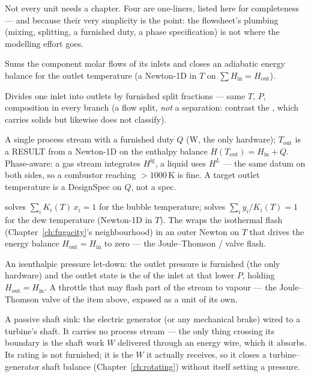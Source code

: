 \documentclass[11pt,a4paper]{article}
\begin{document}
Not every unit needs a chapter.  Four are one-liners, listed here for
completeness --- and because their very simplicity is the point: the
flowsheet's plumbing (mixing, splitting, a furnished duty, a phase
specification) is not where the modelling effort goes.

\begin{description}[leftmargin=*,style=nextline]
  \item[Mixer] Sums the component molar flows of its inlets and closes
        an adiabatic energy balance for the outlet temperature
        (a Newton-1D in $T$ on $\sum H_{\text{in}} = H_{\text{out}}$).
  \item[Splitter] Divides one inlet into outlets by furnished split
        fractions --- same $T$, $P$, composition in every branch (a
        flow split, \emph{not} a separation: contrast the
        , which carries solids but likewise does
        not classify).
  \item[Heater] A single process stream with a furnished duty $Q$
        (W, the only hardware); $T_{\text{out}}$ is a RESULT from a
        Newton-1D on the enthalpy balance $H(T_{\text{out}}) =
        H_{\text{in}} + Q$.  Phase-aware: a gas stream
        integrates $H^{\text{ig}}$, a liquid uses $H^L$ --- the same
        datum on both sides, so a combustor reaching $>1000$\,K is fine.
        A target outlet temperature is a DesignSpec on $Q$, not a spec.
  \item[Saturation \& adiabatic flash]\label{ch:bubble-dew-ref}
         solves $\sum_i K_i(T)\,x_i = 1$ for the bubble
        temperature;  solves $\sum_i y_i/K_i(T) = 1$ for the
        dew temperature (Newton-1D in $T$).  The 
        wraps the isothermal flash (Chapter~\ref{ch:fugacity}'s
        neighbourhood) in an outer Newton on $T$ that drives the
        energy balance $H_{\text{out}}=H_{\text{in}}$ to zero --- the
        Joule--Thomson / valve flash.
  \item[Valve] An isenthalpic pressure let-down: the outlet pressure is
        furnished (the only hardware) and the outlet state is the
         of the inlet at that lower $P$, holding
        $H_{\text{out}}=H_{\text{in}}$.  A throttle that may flash part
        of the stream to vapour --- the Joule--Thomson valve of the item
        above, exposed as a unit of its own.
  \item[ElectricLoad] A passive shaft sink: the electric generator (or
        any mechanical brake) wired to a turbine's shaft.  It carries no
        process stream --- the only thing crossing its boundary is the
        shaft work $W$ delivered through an energy wire, which it
        absorbs.  Its rating is not furnished; it is the $W$ it actually
        receives, so it closes a turbine--generator shaft balance
        (Chapter~\ref{ch:rotating}) without itself setting a pressure.
\end{description}
\end{document}
